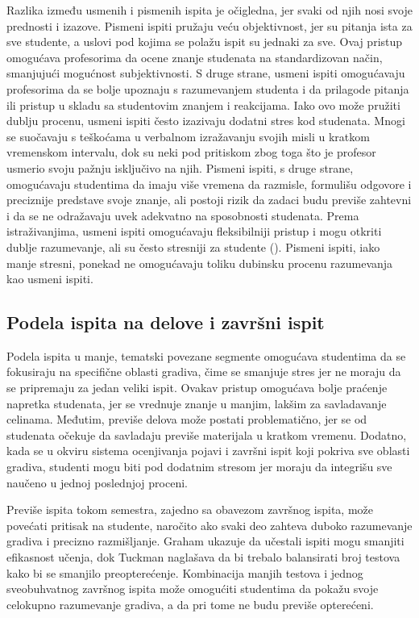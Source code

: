 \documentclass[a4paper]{article}
\begin{document}
Razlika između usmenih i pismenih ispita je očigledna, jer svaki od njih nosi svoje prednosti i izazove. Pismeni ispiti pružaju veću objektivnost, jer su pitanja ista za sve studente, a uslovi pod kojima se polažu ispit su jednaki za sve. Ovaj pristup omogućava profesorima da ocene znanje studenata na standardizovan način, smanjujući mogućnost subjektivnosti. S druge strane, usmeni ispiti omogućavaju profesorima da se bolje upoznaju s razumevanjem studenta i da prilagode pitanja ili pristup u skladu sa studentovim znanjem i reakcijama. Iako ovo može pružiti dublju procenu, usmeni ispiti često izazivaju dodatni stres kod studenata. Mnogi se suočavaju s teškoćama u verbalnom izražavanju svojih misli u kratkom vremenskom intervalu, dok su neki pod pritiskom zbog toga što je profesor usmerio svoju pažnju isključivo na njih. Pismeni ispiti, s druge strane, omogućavaju studentima da imaju više vremena da razmisle, formulišu odgovore i preciznije predstave svoje znanje, ali postoji rizik da zadaci budu previše zahtevni i da se ne odražavaju uvek adekvatno na sposobnosti studenata. Prema istraživanjima, usmeni ispiti omogućavaju fleksibilniji pristup i mogu otkriti dublje razumevanje, ali su često stresniji za studente (\cite{huxham2010oral}). Pismeni ispiti, iako manje stresni, ponekad ne omogućavaju toliku dubinsku procenu razumevanja kao usmeni ispiti.

\subsection{Podela ispita na delove i završni ispit}

Podela ispita u manje, tematski povezane segmente omogućava studentima da se fokusiraju na specifične oblasti gradiva, čime se smanjuje stres jer ne moraju da se pripremaju za jedan veliki ispit. Ovakav pristup omogućava bolje praćenje napretka studenata, jer se vrednuje znanje u manjim, lakšim za savladavanje celinama. Međutim, previše delova može postati problematično, jer se od studenata očekuje da savladaju previše materijala u kratkom vremenu. Dodatno, kada se u okviru sistema ocenjivanja pojavi i završni ispit koji pokriva sve oblasti gradiva, studenti mogu biti pod dodatnim stresom jer moraju da integrišu sve naučeno u jednoj poslednjoj proceni.

Previše ispita tokom semestra, zajedno sa obavezom završnog ispita, može povećati pritisak na studente, naročito ako svaki deo zahteva duboko razumevanje gradiva i precizno razmišljanje. Graham \cite{graham1999practice} ukazuje da učestali ispiti mogu smanjiti efikasnost učenja, dok Tuckman \cite{tuckman1998benefits} naglašava da bi trebalo balansirati broj testova kako bi se smanjilo preopterećenje. Kombinacija manjih testova i jednog sveobuhvatnog završnog ispita može omogućiti studentima da pokažu svoje celokupno razumevanje gradiva, a da pri tome ne budu previše opterećeni.
\end{document}
